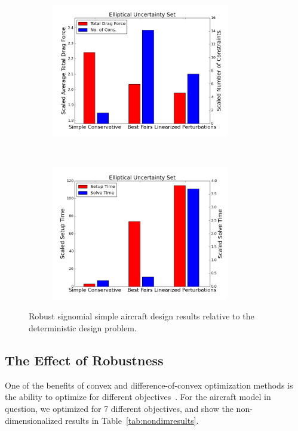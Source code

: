 \begin{figure}[ht]
\begin{subfigure}{0.499\textwidth}
        \includegraphics[height=2.3in]{signomial_simple_flight/ell.png}
    \end{subfigure}%
    ~ 
    \begin{subfigure}{0.49\textwidth}
        \centering
        \includegraphics[height=2.3in]{signomial_simple_flight/ell_times.png}
    \end{subfigure}
    \caption{Robust signomial simple aircraft design results relative to the deterministic design problem.}
    \label{compare_signomial}
\end{figure}

\subsection{The Effect of Robustness}




One of the benefits of convex and difference-of-convex optimization methods is the ability to optimize for
different objectives~\cite{York2018}. For the aircraft model in question, we optimized for 7 different objectives, and show
the non-dimensionalized results in Table~\ref{tab:nondimresults}.

